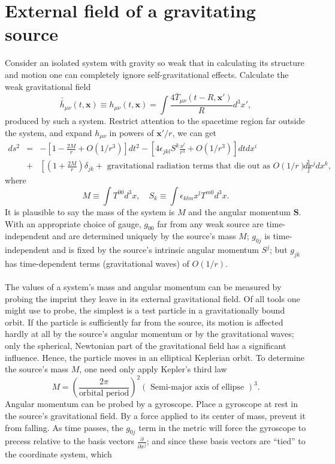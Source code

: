 \section{External field of a gravitating source}
Consider an isolated system with gravity so weak that in calculating its structure and motion one can completely ignore self-gravitational effects. Calculate the weak gravitational field
\[\bar{\bar{h}}_{\mu\nu}(t,\bm{x}) \equiv h_{\mu\nu}(t,\bm{x}) = \int \frac{4\bar{T}_{\mu\nu}(t-R,\bm{x}')}{R} d^3x',\]
produced by such a system. Restrict attention to the spacetime region far outside the system, and expand $h_{\mu\nu}$ in powers of $\bm{x}' / {r}$, we can get
\begin{eqnarray}
ds^2 &=& -\left[1-\frac{2M}{r} + O({1}/{r^3}) \right]dt^2 - \left[4\epsilon_{jkl}S^k \frac{x^l}{r^3} + O({1}/{r^3})  \right] dtdx^i  \nonumber \\
&+& \left[(1+\frac{2M}{r})\delta_{jk} + \mbox{ gravitational radiation terms that die out as } O(1/r) \right]dx^j dx^k , \nonumber
\end{eqnarray}
where
\[M \equiv \int T^{00}d^3x , \quad S_k \equiv \int \epsilon_{klm}x^l T^{m0} d^3x .\]
It is plausible to say the mass of the system is $M$ and the angular momentum $\bm{S}$. With an appropriate choice of gauge, $g_{00}$ far from any weak source are time-independent and are determined uniquely by the source's mass $M$; $g_{0j}$ is time-independent and is fixed by the source's intrinsic angular momentum $S^j$; but $g_{jk}$ has time-dependent terms (gravitational waves) of $O(1/r)$.
\\ \\
The values of a system's mass and angular momentum can be measured by probing the imprint they leave in its external gravitational field. 
Of all tools one might use to probe, the simplest is a test particle in a gravitationally bound orbit. 
If the particle is sufficiently far from the source, its motion is affected hardly at all by the source's angular momentum or by the gravitational waves; only the spherical, Newtonian part of the gravitational field has a significant influence. 
Hence, the particle moves in an elliptical Keplerian orbit. To determine the source's mass $M$, one need only apply Kepler's third law
\[M = \left( \frac{2\pi}{\mbox{orbital period}} \right)^2 \left(\mbox{ Semi-major axis of ellipse } \right)^3.\]
Angular momentum can be probed by a gyroscope.
Place a gyroscope at rest in the source's gravitational field.
By a force applied to its center of mass, prevent it from falling. 
As time passes, the $g_{0j}$ term in the metric will force the gyroscope to precess relative to the basis vectors $\frac{\partial}{\partial x^j}$; and since these basis vectors are ``tied'' to the coordinate system, which

